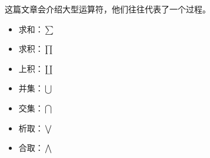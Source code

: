 
这篇文章会介绍大型运算符，他们往往代表了一个过程。


\begin{itemize}
\item 求和：$\sum$
\item 求积：$\prod$
\item 上积：$\coprod$
\item 并集：$\bigcup$
\item 交集：$\bigcap$
\item 析取：$\bigvee$
\item 合取：$\bigwedge$
\end{itemize}
